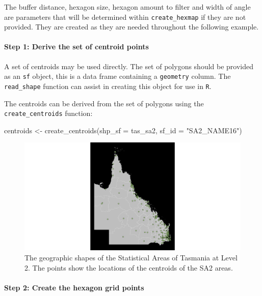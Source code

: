 The buffer distance, hexagon size, hexagon amount to filter and width of
angle are parameters that will be determined within
\texttt{create\_hexmap} if they are not provided. They are created as
they are needed throughout the following example.

\hypertarget{step-1-derive-the-set-of-centroid-points}{%
\paragraph{Step 1: Derive the set of centroid
points}\label{step-1-derive-the-set-of-centroid-points}}

A set of centroids may be used directly. The set of polygons should be
provided as an \texttt{sf} object, this is a data frame containing a
\texttt{geometry} column. The \texttt{read\_shape} function can assist
in creating this object for use in \texttt{R}.

The centroids can be derived from the set of polygons using the
\texttt{create\_centroids} function:

\begin{Schunk}
\begin{Sinput}
centroids <- create_centroids(shp_sf = tas_sa2, sf_id = "SA2_NAME16")
\end{Sinput}
\end{Schunk}

\begin{figure}[h]
\centering
\includegraphics[width=14cm]{figs/1centroids.png}
\caption{\label{fig:centroids_plot}The geographic shapes of the Statistical Areas of Tasmania at Level 2. The points show the locations of the centroids of the SA2 areas.}
\end{figure}

\hypertarget{step-2-create-the-hexagon-grid-points}{%
\paragraph{Step 2: Create the hexagon grid
points}\label{step-2-create-the-hexagon-grid-points}}

